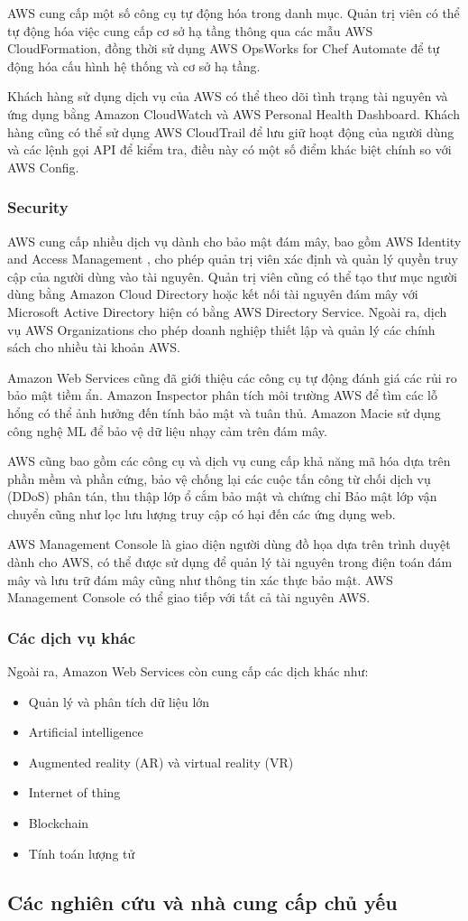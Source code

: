 AWS cung cấp một số công cụ tự động hóa trong danh mục. Quản trị viên có thể tự động hóa việc cung cấp cơ sở hạ tầng thông qua các mẫu AWS CloudFormation, đồng thời sử dụng AWS OpsWorks for Chef Automate để tự động hóa cấu hình hệ thống và cơ sở hạ tầng.

Khách hàng sử dụng dịch vụ của AWS có thể theo dõi tình trạng tài nguyên và ứng dụng bằng Amazon CloudWatch và AWS Personal Health Dashboard. Khách hàng cũng có thể sử dụng AWS CloudTrail để lưu giữ hoạt động của người dùng và các lệnh gọi API để kiểm tra, điều này có một số điểm khác biệt chính so với AWS Config.
\subsubsection{Security}
AWS cung cấp nhiều dịch vụ dành cho bảo mật đám mây, bao gồm AWS Identity and Access Management \cite{aws_iam}, cho phép quản trị viên xác định và quản lý quyền truy cập của người dùng vào tài nguyên. Quản trị viên cũng có thể tạo thư mục người dùng bằng Amazon Cloud Directory hoặc kết nối tài nguyên đám mây với Microsoft Active Directory hiện có bằng AWS Directory Service. Ngoài ra, dịch vụ AWS Organizations cho phép doanh nghiệp thiết lập và quản lý các chính sách cho nhiều tài khoản AWS.

Amazon Web Services cũng đã giới thiệu các công cụ tự động đánh giá các rủi ro bảo mật tiềm ẩn. Amazon Inspector phân tích môi trường AWS để tìm các lỗ hổng có thể ảnh hưởng đến tính bảo mật và tuân thủ. Amazon Macie sử dụng công nghệ ML để bảo vệ dữ liệu nhạy cảm trên đám mây.

AWS cũng bao gồm các công cụ và dịch vụ cung cấp khả năng mã hóa dựa trên phần mềm và phần cứng, bảo vệ chống lại các cuộc tấn công từ chối dịch vụ (DDoS) phân tán, thu thập lớp ổ cắm bảo mật và chứng chỉ Bảo mật lớp vận chuyển cũng như lọc lưu lượng truy cập có hại đến các ứng dụng web.

AWS Management Console là giao diện người dùng đồ họa dựa trên trình duyệt dành cho AWS, có thể được sử dụng để quản lý tài nguyên trong điện toán đám mây và lưu trữ đám mây cũng như thông tin xác thực bảo mật. AWS Management Console có thể giao tiếp với tất cả tài nguyên AWS.
\subsubsection{Các dịch vụ khác}
Ngoài ra, Amazon Web Services còn cung cấp các dịch khác như:
\begin{itemize}
\item Quản lý và phân tích dữ liệu lớn
\item Artificial intelligence
\item Augmented reality (AR) và virtual reality (VR)
\item Internet of thing
\item Blockchain
\item Tính toán lượng tử
\end{itemize}
\subsection{Các nghiên cứu và nhà cung cấp chủ yếu}